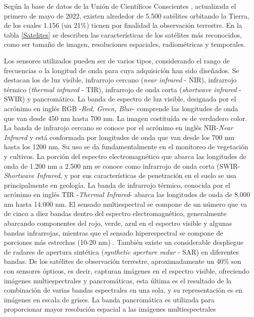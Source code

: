 Según la base de datos de la Unión de Científicos Conscientes \cite{noauthor_satelites_nodate}, actualizada el primero de mayo de 2022, existen alrededor de 5.500 satélites orbitando la Tierra, de los cuales 1.156 (un 21\%) tienen por finalidad la observación terrestre. En la tabla \ref{Satelites} se describen las características de los satélites más reconocidos, como ser tamaño de imagen, resoluciones espaciales, radiométricas y temporales. 

Los sensores utilizados pueden ser de varios tipos, considerando el rango de frecuencias o la longitud de onda para cuya adquisición han sido diseñados. Se destacan los de luz visible, infrarrojo cercano (\textit{near infrared} - NIR), infrarrojo térmico (\textit{thermal infrared} - TIR), infrarrojo de onda corta (\textit{shortwave infrared} - SWIR) y pancromático. La banda de espectro de luz visible, designada por el acrónimo en inglés RGB -\textit{Red, Green, Blue}- comprende las longitudes de onda que van desde 450 nm hasta 700 nm. La imagen costituída es de verdadero color. La banda de infrarojo cercano se conoce por el acrónimo en inglés NIR-\textit{Near Infrared} y está conformada por longitudes de onda que van desde los 700 nm hasta los 1200 nm. Su uso se da fundamentalmente en el monitoreo de vegetación y cultivos. La porción del espectro electromagnético que abarca las longitudes de onda de 1.200 nm a 2.500 nm se conoce como infrarrojo de onda corta (SWIR-\textit{Shortwave Infrared}, y por sus características de penetración en el suelo se usa principalmente en geología. La banda de infrarrojo térmico, conocida por el acrónimo en inglés TIR -\textit{Thermal Infrared}- abarca las longitudes de onda de 8.000 nm hasta 14.000 nm. El sensado multiespectral se compone de un número que va de cinco a diez bandas dentro del espectro electromagnético, generalmente abarcando componentes del rojo, verde, azul en el espectro visible y algunas bandas infrarrojas, mientras que el sensado hiperespectral se compone de porciones más estrechas (10-20 nm) \cite{noauthor_banda_2021}.  También existe un considerable despliegue de radares de apertura sintética (\textit{synthetic aperture radar} - SAR) en diferentes bandas. De los satélites de observación terrestre, aproximadamente un 40\% son con sensores ópticos, es decir, capturan imágenes en el espectro visible, ofreciendo imágenes multiespectrales y pancromáticas, esta última es el resultado de la combinación de varias bandas espectrales en una sola, y su representación es en imágenes en escala de grises. La banda pancromática es utilizada para proporcionar mayor resolución espacial a las imágenes multiespectrales \cite{noauthor_hiperespectral_2024}

